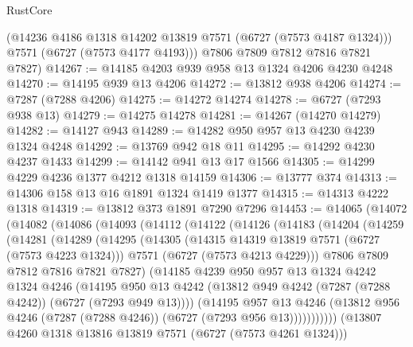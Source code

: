 \begin{lexlean}{RustCore}
\begin{coremodule}
        (@14236 @4186 @1318 @14202 @13819 @7571 (@6727 (@7573 @4187 @1324)))
        @7571
        (@6727 (@7573 @4177 @4193)))
      @7806
      @7809
      @7812
      @7816
      @7821
      @7827)
@14267 := @14185 @4203 @939 @958 @13 @1324 @4206 @4230 @4248
@14270 := @14195 @939 @13 @4206
@14272 := @13812 @938 @4206
@14274 := @7287 (@7288 @4206)
@14275 := @14272 @14274
@14278 := @6727 (@7293 @938 @13)
@14279 := @14275 @14278
@14281 := @14267 (@14270 @14279)
@14282 := @14127 @943
@14289 := @14282 @950 @957 @13 @4230 @4239 @1324 @4248
@14292 := @13769 @942 @18 @11
@14295 := @14292 @4230 @4237 @1433
@14299 := @14142 @941 @13 @17 @1566
@14305 := @14299 @4229 @4236 @1377 @4212 @1318 @14159
@14306 := @13777 @374
@14313 := @14306 @158 @13 @16 @1891 @1324 @1419 @1377
@14315 := @14313 @4222 @1318
@14319 := @13812 @373 @1891 @7290 @7296
@14453 := @14065
    (@14072
      (@14082
        (@14086
          (@14093
            (@14112
              (@14122
                (@14126
                  (@14183
                    (@14204
                      (@14259
                        (@14281
                          (@14289
                            (@14295
                              (@14305
                                (@14315 @14319 @13819 @7571 (@6727 (@7573 @4223 @1324)))
                                @7571
                                (@6727 (@7573 @4213 @4229)))
                              @7806
                              @7809
                              @7812
                              @7816
                              @7821
                              @7827)
                            (@14185
                              @4239
                              @950
                              @957
                              @13
                              @1324
                              @4242
                              @1324
                              @4246
                              (@14195
                                @950
                                @13
                                @4242
                                (@13812 @949 @4242 (@7287 (@7288 @4242)) (@6727 (@7293 @949 @13))))
                              (@14195
                                @957
                                @13
                                @4246
                                (@13812
                                  @956
                                  @4246
                                  (@7287 (@7288 @4246))
                                  (@6727 (@7293 @956 @13)))))))))))
                (@13807 @4260 @1318 @13816 @13819 @7571 (@6727 (@7573 @4261 @1324)))

\end{coremodule}
\end{lexlean}
